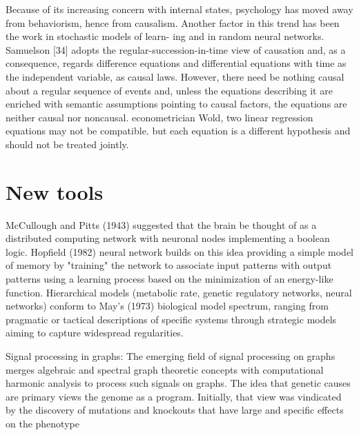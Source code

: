 \documentclass[onecollarge,runningheads]{svjour2}
\begin{document}
Because of its increasing concern with internal states, psychology has moved away from behaviorism, hence from causalism. Another factor in this trend has been the work in stochastic models of learn- ing and in random neural networks.
Samuelson [34] adopts the regular-succession-in-time view of causation  and, as a consequence, regards difference equations and differential equations with time as the independent variable, as causal laws. However, there need be nothing causal about a regular sequence of events and, unless the equations describing it are enriched with semantic assumptions pointing to causal factors, the equations are neither causal nor noncausal.
 econometrician Wold,  two linear regression equations may not be compatible. but each equation is a different hypothesis and should not be treated jointly. 


\section{New tools}
McCullough and Pitts (1943) suggested that the brain be thought of as a distributed computing network with neuronal nodes implementing a boolean logic. Hopfield (1982) neural network builds on this idea providing a simple model of memory by "training" the network to associate input patterns with output patterns using a learning process based on the minimization of an energy-like function.
Hierarchical models  (metabolic rate, genetic regulatory networks, neural networks) conform to May's (1973) biological model spectrum, ranging from pragmatic or tactical descriptions of specific systems through strategic models aiming to capture widespread regularities.%

Signal processing in graphs: The emerging field of signal processing on graphs merges algebraic and spectral graph theoretic concepts with computational harmonic analysis to process such signals on graphs.  The idea that genetic causes are primary views the genome as a program. Initially, that view was vindicated by the discovery of mutations and knockouts that have large and specific effects on the phenotype

\citep{shuman2013emerging}


\end{document}
